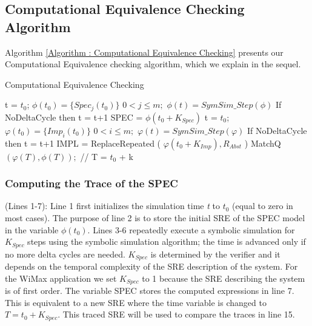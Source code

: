 \documentclass[submission,copyright,creativecommons]{eptcs}
\begin{document}
\subsection{Computational Equivalence Checking Algorithm}
Algorithm \ref{Algorithm : Computational Equivalence Checking} presents our Computational Equivalence checking algorithm, which we explain in the sequel.

\begin{algorithm}
\caption{Computational Equivalence Checking}
\label{Algorithm : Computational Equivalence Checking}
\begin{algorithmic}[1]

\STATE t = \(t_{0}\);
\STATE \( \phi(t_{0}) = \{ Spec_{j}(t_{0}) \}\) \( 0 < j \leq m ;\)
\STATE \( \phi(t) = SymSim\_Step(\phi) \)
\STATE If NoDeltaCycle then t = t+1
\ENDWHILE
\STATE SPEC = \( \phi(t_{0}+K_{Spec})\)
\STATE t = \(t_{0}\);
\STATE   \( \varphi(t_{0}) =  \{ Imp_{i}(t_{0})\}\)  \(0 < i \leq m;\)
\STATE \( \varphi(t) = SymSim\_Step(\varphi) \)
\STATE If NoDeltaCycle then t = t+1
\ENDWHILE
\STATE IMPL = ReplaceRepeated ( \( \varphi (t_{0}+K_{Imp}) , R_{Abst}  \) )
\STATE MatchQ  \( (\varphi(T) , \phi(T)); \) // T = \(t_{0}\) + k

\end{algorithmic}
\end{algorithm}

\subsubsection{Computing the Trace of the SPEC}

(Lines 1-7): Line 1 first initializes the simulation time \emph{t} to \(t_{0}\) (equal to zero in most cases). The purpose of line 2 is to store the initial SRE of the SPEC model in the variable \(\phi(t_{0})\). Lines 3-6 repeatedly execute a symbolic simulation for \(K_{Spec}\) steps using the symbolic simulation algorithm; the time is advanced only if no more delta cycles are needed. \(K_{Spec}\) is determined by the verifier and it depends on the temporal complexity of the SRE description of the system. For the WiMax application we set \(K_{Spec}\) to 1 because the SRE describing the system is of first order. The variable SPEC stores the computed expressions in line 7. This is equivalent to a new SRE where the time variable is changed to \(T = t_{0}+K_{Spec}\). This traced SRE will be used to compare the traces in line 15.
\end{document}
